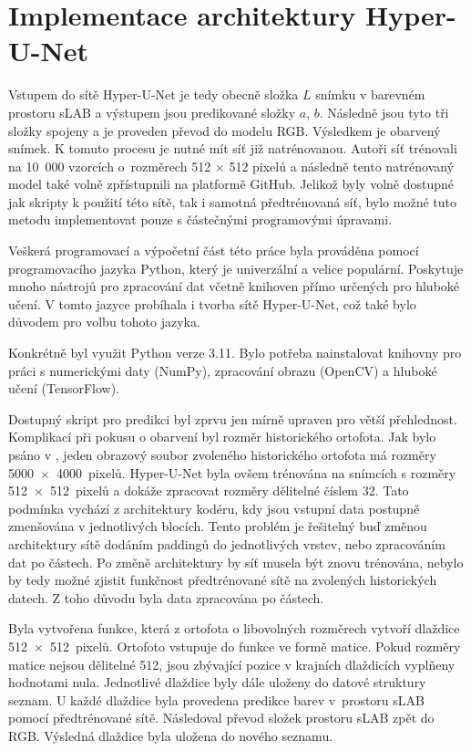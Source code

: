 \section{Implementace architektury Hyper-U-Net}

Vstupem do sítě Hyper-U-Net je tedy obecně složka $L$ snímku v barevném prostoru sLAB a výstupem jsou predikované složky $a$, $b$. Následně jsou tyto tři složky spojeny a je proveden převod do modelu RGB. Výsledkem je obarvený snímek. K tomuto procesu je nutné mít síť již natrénovanou. Autoři síť trénovali na 10~000 vzorcích o~rozměrech 512 $\times$ 512 pixelů a následně tento natrénovaný model také volně zpřístupnili na platformě GitHub. Jelikož byly volně dostupné jak skripty k použití této sítě, tak i samotná předtrénovaná síť, bylo možné tuto metodu implementovat pouze s částečnými programovými úpravami.

Veškerá programovací a výpočetní část této práce byla prováděna pomocí programovacího jazyka Python, který je univerzální a velice populární. Poskytuje mnoho nástrojů pro zpracování dat včetně knihoven přímo určených pro hluboké učení. V tomto jazyce probíhala i tvorba sítě Hyper-U-Net, což také bylo důvodem pro volbu tohoto jazyka.

Konkrétně byl využit Python verze 3.11. Bylo potřeba nainstalovat knihovny pro práci s numerickými daty (NumPy), zpracování obrazu (OpenCV) a hluboké učení (TensorFlow).

Dostupný skript pro predikci byl zprvu jen mírně upraven pro větší přehlednost. Komplikací při pokusu o obarvení byl rozměr historického ortofota. Jak bylo psáno v , jeden obrazový soubor zvoleného historického ortofota má rozměry 5000~$\times$~4000~pixelů. Hyper-U-Net byla ovšem trénována na snímcích s rozměry 512~$\times$~512~pixelů a dokáže zpracovat rozměry dělitelné číslem 32. Tato podmínka vychází z architektury kodéru, kdy jsou vstupní data postupně zmenšována v jednotlivých blocích. Tento problém je řešitelný buď změnou architektury sítě dodáním paddingů do jednotlivých vrstev, nebo zpracováním dat po částech. Po změně architektury by síť musela být znovu trénována, nebylo by tedy možné zjistit funkčnost předtrénované sítě na zvolených historických datech. Z toho důvodu byla data zpracována po částech.

Byla vytvořena funkce, která z ortofota o libovolných rozměrech vytvoří dlaždice 512~$\times$~512~pixelů. Ortofoto vstupuje do funkce ve formě matice. Pokud rozměry matice nejsou dělitelné 512, jsou zbývající pozice v krajních dlaždicích vyplňeny hodnotami nula. Jednotlivé dlaždice byly dále uloženy do datové struktury seznam. U každé dlaždice byla provedena predikce barev v~prostoru sLAB pomocí předtrénované sítě. Následoval převod složek prostoru sLAB zpět do RGB. Výsledná dlaždice byla uložena do nového seznamu.

